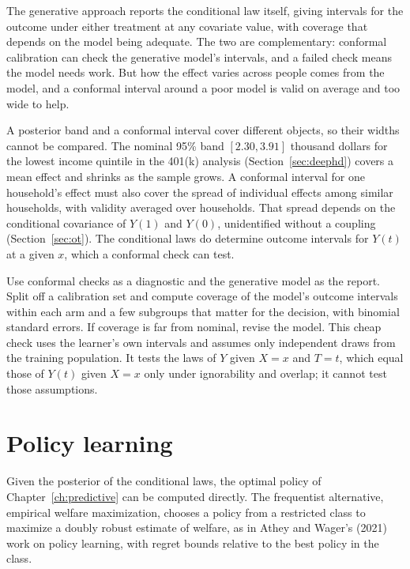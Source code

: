 The generative approach reports the conditional law itself, giving intervals for the outcome under either treatment at any covariate value, with coverage that depends on the model being adequate. The two are complementary: conformal calibration can check the generative model's intervals, and a failed check means the model needs work. But how the effect varies across people comes from the model, and a conformal interval around a poor model is valid on average and too wide to help.

A posterior band and a conformal interval cover different objects, so their widths cannot be compared. The nominal 95\% band $[2.30, 3.91]$ thousand dollars for the lowest income quintile in the 401(k) analysis (Section~\ref{sec:deephd}) covers a mean effect and shrinks as the sample grows. A conformal interval for one household's effect must also cover the spread of individual effects among similar households, with validity averaged over households. That spread depends on the conditional covariance of $Y(1)$ and $Y(0)$, unidentified without a coupling (Section~\ref{sec:ot}). The conditional laws do determine outcome intervals for $Y(t)$ at a given $x$, which a conformal check can test.

Use conformal checks as a diagnostic and the generative model as the report. Split off a calibration set and compute coverage of the model's outcome intervals within each arm and a few subgroups that matter for the decision, with binomial standard errors. If coverage is far from nominal, revise the model. This cheap check uses the learner's own intervals and assumes only independent draws from the training population. It tests the laws of $Y$ given $X = x$ and $T = t$, which equal those of $Y(t)$ given $X = x$ only under ignorability and overlap; it cannot test those assumptions.

\section{Policy learning}

Given the posterior of the conditional laws, the optimal policy of Chapter~\ref{ch:predictive} can be computed directly. The frequentist alternative, empirical welfare maximization, chooses a policy from a restricted class to maximize a doubly robust estimate of welfare, as in Athey and Wager's (2021) work on policy learning, with regret bounds relative to the best policy in the class.

